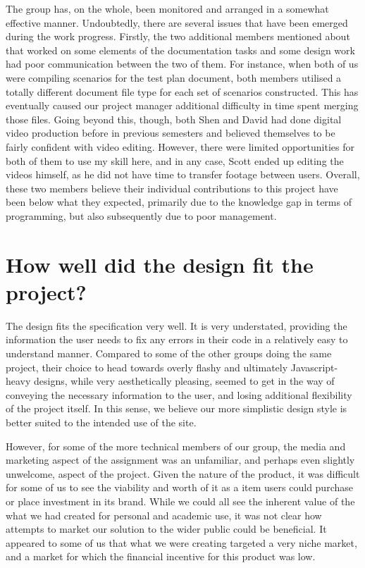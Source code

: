 \documentclass[10pt]{article}
\begin{document}
The group has, on the whole, been monitored and arranged in a somewhat effective manner. Undoubtedly, there are several issues that have been emerged during the work progress. Firstly, the two additional members mentioned about that worked on some elements of the documentation tasks and some design work had poor communication between the two of them. For instance, when both of us were compiling scenarios for the test plan document, both members utilised a totally different document file type for each set of scenarios constructed. This has eventually caused our project manager additional difficulty in time spent merging those files. Going beyond this, though, both Shen and David had done digital video production before in previous semesters and believed themselves to be fairly confident with video editing. However, there were limited opportunities for both of them to use my skill here, and in any case, Scott ended up editing the videos himself, as he did not have time to transfer footage between users. Overall, these two members believe their individual contributions to this project have been below what they expected, primarily due to the knowledge gap in terms of programming, but also subsequently due to poor management.

\section*{How well did the design fit the project?}

The design fits the specification very well. It is very understated, providing the information the user needs to fix any errors in their code in a relatively easy to understand manner. Compared to some of the other groups doing the same project, their choice to head towards overly flashy and ultimately Javascript-heavy designs, while very aesthetically pleasing, seemed to get in the way of conveying the necessary information to the user, and losing additional flexibility of the project itself. In this sense, we believe our more simplistic design style is better suited to the intended use of the site.

However, for some of the more technical members of our group, the media and marketing aspect of the assignment was an unfamiliar, and perhaps even slightly unwelcome, aspect of the project. Given the nature of the product, it was difficult for some of us to see the viability and worth of it as a item users could purchase or place investment in its brand. While we could all see the inherent value of the what we had created for personal and academic use, it was not clear how attempts to market our solution to the wider public could be beneficial. It appeared to some of us that what we were creating targeted a very niche market, and a market for which the financial incentive for this product was low.
\end{document}
